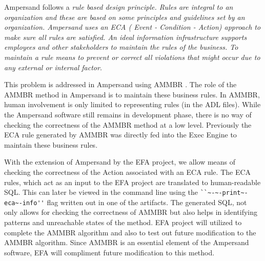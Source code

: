 %

Ampersand follows a \em{rule based} design principle. Rules are integral to an organization
and these are based on some principles and guidelines set by an organization.
Ampersand uses an ECA ( Event - Condition - Action) approach to make sure all rules are satisfied. An ideal information infrastructure supports employees and other stakeholders to maintain the rules of the business. To maintain a rule means to prevent or correct all violations that might occur due to any external or internal factor.
 
 This problem is addressed in Ampersand using AMMBR \citep{Ampersand}. The role of the AMMBR method in Ampersand is to maintain these business rules. In AMMBR, human involvement is only limited to representing rules (in the ADL files). While the Ampersand software still remains in development phase, there is no way of checking the correctness of the AMMBR method at a low level. Previously the ECA rule generated by AMMBR was directly fed into the Exec Engine to maintain these business rules. 
 
With the extension of Ampersand by the EFA project, we allow means of checking the correctness of the Action associated with an ECA rule. The ECA rules, which act as an input to the EFA project are translated to human-readable SQL. This can later be viewed in the command line using the \verb|``~-~-print~-eca~-info''| flag written out in one of the artifacts. The generated SQL, not only allows for checking the correctness of AMMBR but also helps in identifying 
patterns and unreachable states of the method. EFA project will utilized to complete the AMMBR algorithm and also to test out future modification to the AMMBR algorithm. Since AMMBR is an essential element of the Ampersand software, EFA will compliment future modification to this method.
 

%